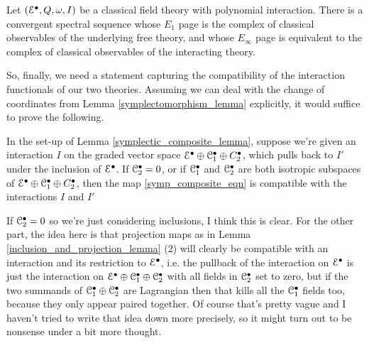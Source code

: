 \documentclass[10pt, oneside]{article}
\begin{document}
\begin{lemma}
Let $(\mathcal{E}^\bullet, Q, \omega, I)$ be a classical field theory with polynomial interaction.  There is a convergent spectral sequence whose $E_1$ page is the complex of classical observables of the underlying free theory, and whose $E_\infty$ page is equivalent to the complex of classical observables of the interacting theory.
\end{lemma}

So, finally, we need a statement capturing the compatibility of the interaction functionals of our two theories.  Assuming we can deal with the change of coordinates from Lemma \ref{symplectomorphism_lemma} explicitly, it would suffice to prove the following.
\begin{lemma} 
In the set-up of Lemma \ref{symplectic_composite_lemma}, suppose we're given an interaction $I$ on the graded vector space $\mathcal{E}^\bullet \oplus \mathcal{C}_1^\bullet \oplus C_2^\bullet$, which pulls back to $I'$ under the inclusion of $\mathcal{E}^\bullet$.  If $\mathcal{C}_2^\bullet = 0$, or if $\mathcal{C}_1^\bullet$ and $\mathcal{C}_2^\bullet$ are both isotropic subspaces of $\mathcal{E}^\bullet \oplus \mathcal{C}_1^\bullet \oplus C_2^\bullet$, then the map \ref{symp_composite_eqn} is compatible with the interactions $I$ and $I'$
\end{lemma}

If $\mathcal{C}_2^\bullet = 0$ so we're just considering inclusions, I think this is clear.  For the other part, the idea here is that projection maps as in Lemma \ref{inclusion_and_projection_lemma} (2) will clearly be compatible with an interaction and its restriction to $\mathcal{E}^\bullet$, i.e. the pullback of the interaction on $\mathcal{E}^\bullet$ is just the interaction on $\mathcal{E}^\bullet \oplus \mathcal{C}_1^\bullet \oplus \mathcal{C}_2^\bullet$ with all fields in $\mathcal{C}_2^\bullet$ set to zero, but if the two summands of $\mathcal{C}_1^\bullet \oplus \mathcal{C}_2^\bullet$ are Lagrangian then that kills all the $\mathcal{C}_1^\bullet$ fields too, because they only appear paired together.  Of course that's pretty vague and I haven't tried to write that idea down more precisely, so it might turn out to be nonsense under a bit more thought.
\end{document}

